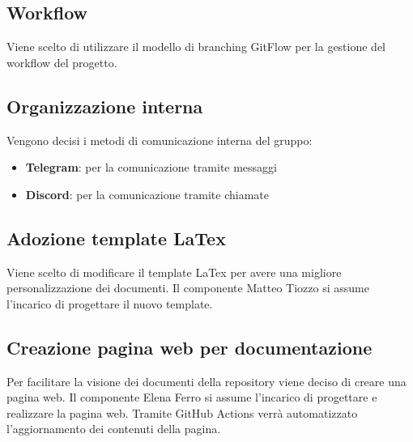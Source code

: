 \documentclass[italian,12pt]{article} %
\begin{document}
\subsection{Workflow}
\begin{flushleft}
	Viene scelto di utilizzare il modello di branching GitFlow per la gestione del workflow del progetto.
\end{flushleft}
\subsection{Organizzazione interna}
\begin{flushleft}
	Vengono decisi i metodi di comunicazione interna del gruppo:
	\begin{itemize}
		\item \textbf{Telegram}: per la comunicazione tramite messaggi
		\item \textbf{Discord}: per la comunicazione tramite chiamate
	\end{itemize}
\end{flushleft}
\subsection{Adozione template LaTex}
\begin{flushleft}
	Viene scelto di modificare il template LaTex per avere una migliore personalizzazione dei documenti. Il componente Matteo Tiozzo si assume l'incarico di progettare il nuovo template. 
\end{flushleft}
\subsection{Creazione pagina web per documentazione}
\begin{flushleft}
	Per facilitare la visione dei documenti della repository viene deciso di creare una pagina web. Il componente Elena Ferro si assume l'incarico di progettare e realizzare la pagina web. Tramite GitHub Actions verrà automatizzato l'aggiornamento dei contenuti della pagina.
\end{flushleft}
\end{document}
